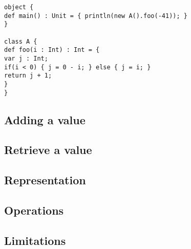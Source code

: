 \begin{lstlisting}
object {
def main() : Unit = { println(new A().foo(-41)); }
}

class A {
def foo(i : Int) : Int = {
var j : Int;
if(i < 0) { j = 0 - i; } else { j = i; }
return j + 1;
}
}
\end{lstlisting}

\subsection{Adding a value}
\subsection{Retrieve a value}

\subsection{Representation}
\subsection{Operations}
\subsection{Limitations}